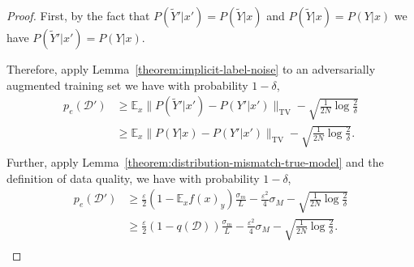     
    
    
    
    
    \begin{proof}
    First, by the fact that $P(\tilde{Y}'| x') = P(\tilde{Y} | x)$ and $P(\tilde{Y} | x) = P(Y | x)$ we have $P(\tilde{Y}'| x') =  P(Y | x)$.
    
    Therefore, apply Lemma~\ref{theorem:implicit-label-noise} to an adversarially augmented training set we have with probability $1 - \delta$,
    $$
    \begin{aligned}
    p_e(\mathcal{D'}) 
    & \ge \mathbb{E}_x \|P(\tilde{Y}'| x') - P(Y' | x')\|_{\text{TV}} -\sqrt{\frac{1}{2N}\log\frac{2}{\delta}} \\
    & \ge \mathbb{E}_x \|P(Y | x) - P(Y' | x')\|_{\text{TV}} -\sqrt{\frac{1}{2N}\log\frac{2}{\delta}}. \\
    \end{aligned}
    $$
    Further, apply Lemma~\ref{theorem:distribution-mismatch-true-model} and the definition of data quality, we have with probability $1 - \delta$,
    $$
    \begin{aligned}
    p_e(\mathcal{D'}) 
    & \ge \frac{\varepsilon}{2} (1 - \mathbb{E}_x f(x)_y) \frac{\sigma_m}{L}  - \frac{\varepsilon^2}{4} \sigma_M - \sqrt{\frac{1}{2N}\log\frac{2}{\delta}} \\
    & \ge \frac{\varepsilon}{2} (1 - q(\mathcal{D})) \frac{\sigma_m}{L}  - \frac{\varepsilon^2}{4} \sigma_M - \sqrt{\frac{1}{2N}\log\frac{2}{\delta}}. \\    
    \end{aligned}
    $$
    
    \end{proof}
    

    